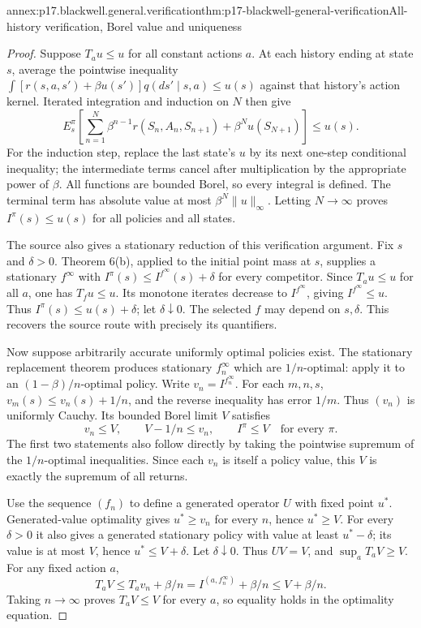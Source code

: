 \begin{annexitem}{annex:p17.blackwell.general.verification}{thm:p17-blackwell-general-verification}{All-history verification, Borel value and uniqueness}
\begin{proof}
Suppose \(T_au\leq u\) for all constant actions \(a\).
At each history ending at state \(s\), average the
pointwise inequality
\(\int[r(s,a,s')+\beta u(s')]q(ds'\mid s,a)\leq u(s)\)
against that history's action kernel.
Iterated integration and induction on \(N\) then give
\[
 E_s^\pi\left[\sum_{n=1}^N\beta^{n-1}r(S_n,A_n,S_{n+1})
                      +\beta^Nu(S_{N+1})\right]\leq u(s).
\]
For the induction step, replace the last state's \(u\)
by its next one-step conditional inequality; the
intermediate terms cancel after multiplication by the
appropriate power of \(\beta\). All functions are bounded
Borel, so every integral is defined. The terminal term
has absolute value at most \(\beta^N\|u\|_\infty\).
Letting \(N\to\infty\) proves \(I^\pi(s)\leq u(s)\)
for all policies and all states.

The source also gives a stationary reduction of this
verification argument. Fix \(s\) and \(\delta>0\).
Theorem 6(b), applied to the initial point mass at \(s\),
supplies a stationary \(f^\infty\) with
\(I^\pi(s)\leq I^{f^\infty}(s)+\delta\) for every
competitor. Since \(T_au\leq u\) for all \(a\), one has
\(T_fu\leq u\). Its monotone iterates decrease to
\(I^{f^\infty}\), giving \(I^{f^\infty}\leq u\).
Thus \(I^\pi(s)\leq u(s)+\delta\); let \(\delta\downarrow0\).
The selected \(f\) may depend on \(s,\delta\). This
recovers the source route with precisely its quantifiers.

Now suppose arbitrarily accurate uniformly optimal policies
exist. The stationary replacement theorem produces stationary
\(f_n^\infty\) which are \(1/n\)-optimal: apply it to an
\((1-\beta)/n\)-optimal policy.
Write \(v_n=I^{f_n^\infty}\).
For each \(m,n,s\), \(v_m(s)\leq v_n(s)+1/n\), and
the reverse inequality has error \(1/m\).
Thus \((v_n)\) is uniformly Cauchy. Its bounded Borel
limit \(V\) satisfies
\[
               v_n\leq V,\qquad V-1/n\leq v_n,\qquad
               I^\pi\leq V\quad\text{for every }\pi.
\]
The first two statements also follow directly by taking
the pointwise supremum of the \(1/n\)-optimal inequalities.
Since each \(v_n\) is itself a policy value, this \(V\)
is exactly the supremum of all returns.

Use the sequence \((f_n)\) to define a generated operator
\(U\) with fixed point \(u^*\).
Generated-value optimality gives \(u^*\geq v_n\)
for every \(n\), hence \(u^*\geq V\).
For every \(\delta>0\) it also gives a generated stationary
policy with value at least \(u^*-\delta\); its value
is at most \(V\), hence \(u^*\leq V+\delta\).
Let \(\delta\downarrow0\). Thus \(UV=V\), and
\(\sup_aT_aV\geq V\).
For any fixed action \(a\),
\[
       T_aV\leq T_av_n+\beta/n
             =I^{(a,f_n^\infty)}+\beta/n
             \leq V+\beta/n .
\]
Taking \(n\to\infty\) proves \(T_aV\leq V\) for
every \(a\), so equality holds in the optimality equation.


\end{proof}
\end{annexitem}
